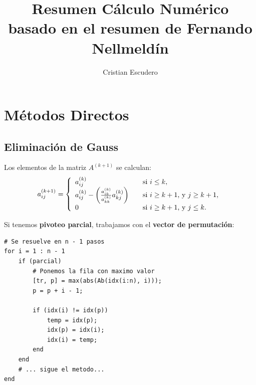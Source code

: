 \documentclass[10pt,a4paper]{article}
\author{Cristian Escudero}
\title{Resumen Cálculo Numérico \\ \small{basado en el resumen de Fernando Nellmeldín}}
\begin{document}
\maketitle


\section{Métodos Directos}

\subsection{Eliminación de Gauss}
Los elementos de la matriz $A^{(k+1)}$ se calculan:
\begin{align*}
  a_{ij}^{(k+1)} = \left\{ 
  \begin{array}{l l}
    a_{ij}^{(k)} & \quad \text{si $i\leq k$},\\
    a_{ij}^{(k)}-\left(\frac{a_{ik}^{(k)}}{a_{kk}^{(k)}}a_{kj}^{(k)}\right) & \quad \text{si $i \geq k+1$, y $j \geq k+1$},\\
    0 &\quad \text{si $i \geq k+1$, y $j \leq k$}.
  \end{array} \right.
\end{align*}

Si tenemos \textbf{pivoteo parcial}, trabajamos con el \textbf{vector de permutación}:
\begin{lstlisting}
# Se resuelve en n - 1 pasos
for i = 1 : n - 1
	if (parcial)
		# Ponemos la fila con maximo valor
	    [tr, p] = max(abs(Ab(idx(i:n), i)));
	    p = p + i - 1;
    
		if (idx(i) != idx(p))	        
			temp = idx(p);
			idx(p) = idx(i);
			idx(i) = temp;
	    end
	end
	# ... sigue el metodo...
end
\end{lstlisting}
\end{document}
